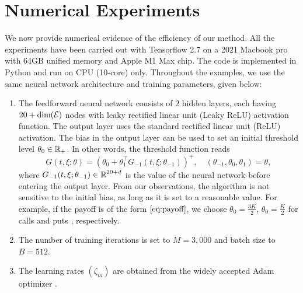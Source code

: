 \section{Numerical Experiments}

We now provide numerical evidence of the efficiency of our method. All the  experiments have been carried out  with Tensorflow 2.7  on a 2021 Macbook pro with 64GB unified memory and Apple M1 Max chip. The code is implemented in Python and run on CPU (10-core) only. %
Throughout the examples, we use the same neural network architecture and training parameters,  given  below:
\begin{enumerate}
\item The feedforward neural network consists of $2$ hidden layers, each having $20 + \text{dim}(\operatorname{\mathcal{E}})$  nodes  with leaky rectified linear unit (Leaky ReLU) activation function. The output layer uses the standard rectified linear unit (ReLU)  activation. The  bias in the output layer can be used to set  an initial threshold level $\theta_0 \in \operatorname{\mathbb{R}}_+$.     In other words, the  threshold function reads
$$G(t,\xi; \theta) = \left(\theta_0 + \theta_1^{\top} G_{-1}(t,\xi; \theta_{-1})\right)^+, \quad (\theta_{-1}, \theta_{0}, \theta_1) = \theta, $$ %
where  $G_{-1}(t,\xi; \theta_{-1}) \in \operatorname{\mathbb{R}}^{20+\bar{d}}$ is the value of the neural network before entering the output layer. From our observations, the algorithm is not sensitive to the initial bias, as long as it is set to a reasonable value.  For example, if the payoff is of the form   $\eqref{eq:payoff}$, we  choose $\theta_0=\frac{3K}{2}$,  $\theta_0=\frac{K}{2}$ for  calls %
and puts %
,  respectively. 
\item The number of training iterations is set to $M=3,000$ and batch size to $B = 512$. 
    \item The learning rates $(\zeta_m)$ are obtained from the widely accepted Adam optimizer \cite{Kingma}.
    

\end{enumerate}
